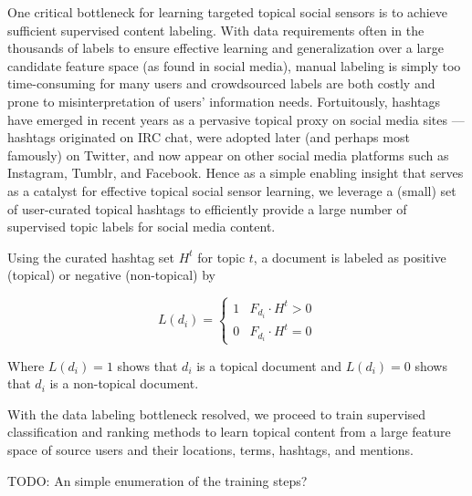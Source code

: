 One critical bottleneck for learning targeted topical social sensors
is to achieve sufficient supervised content labeling.  With data
requirements often in the thousands of labels to ensure effective
learning and generalization over a large candidate feature space (as
found in social media), manual labeling is simply too time-consuming
for many users and crowdsourced labels are both costly and prone to
misinterpretation of users' information needs.  Fortuitously, hashtags
have emerged in recent years as a pervasive topical proxy on social
media sites --- hashtags originated on IRC chat, were adopted later
(and perhaps most famously) on Twitter, and now appear on other social
media platforms such as Instagram, Tumblr, and Facebook.  Hence as a
simple enabling insight that serves as a catalyst for effective
topical social sensor learning, we leverage a (small) set of
user-curated topical hashtags to efficiently provide a large number of
supervised topic labels for social media content.

Using the curated hashtag set $H^{t}$ for topic $t$, a document is labeled as positive (topical) or negative (non-topical) by

\begin{equation}
L(d_{i}) = \left\{\begin{matrix}
1 & F_{d_{i}} \cdot H^{t} > 0  \\ 
0 & F_{d_{i}} \cdot H^{t} = 0
\end{matrix}\right.
\label{eq:labeling}
\end{equation}

Where $L(d_{i}) = 1$ shows that $d_{i}$ is a topical document and $L(d_{i}) = 0$ shows that $d_{i}$ is a non-topical document.

With the data labeling bottleneck resolved, we proceed to train
supervised classification and ranking methods to learn topical content
from a large feature space of source users and their locations, terms,
hashtags, and mentions.

TODO: An simple enumeration of the training steps?


